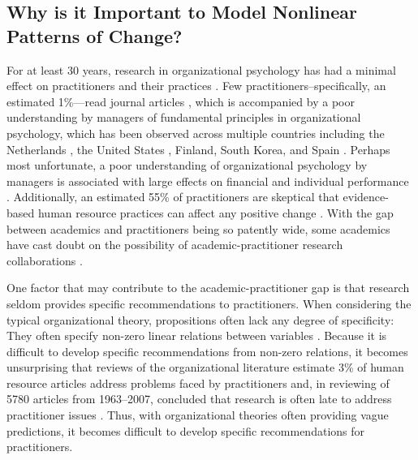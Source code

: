\documentclass[
12pt, %
twoside,
english]{guelphthesis}
\begin{document}
\hypertarget{why-is-it-important-to-model-nonlinear-patterns-of-change}{%
\subsection{Why is it Important to Model Nonlinear Patterns of Change?}\label{why-is-it-important-to-model-nonlinear-patterns-of-change}}

For at least 30 years, research in organizational psychology has had a minimal effect on practitioners and their practices \autocites{daft1990}[for a review, see][]{lawler2022}. Few practitioners--specifically, an estimated 1\%---read journal articles \autocite{rynes2002a}, which is accompanied by a poor understanding by managers of fundamental principles in organizational psychology, which has been observed across multiple countries including the Netherlands \autocite{sanders2008}, the United States \autocite{rynes2002a}, Finland, South Korea, and Spain \autocite{tenhiälä2014}. Perhaps most unfortunate, a poor understanding of organizational psychology by managers is associated with large effects on financial and individual performance \autocite[for a review, see][]{rynes2002b}. Additionally, an estimated 55\% of practitioners are skeptical that evidence-based human resource practices can affect any positive change \autocite{kpmg2015}. With the gap between academics and practitioners being so patently wide, some academics have cast doubt on the possibility of academic-practitioner research collaborations \autocite{kieser2009}.

One factor that may contribute to the academic-practitioner gap is that research seldom provides specific recommendations to practitioners. When considering the typical organizational theory, propositions often lack any degree of specificity: They often specify non-zero linear relations between variables \autocite{edwards2010}. Because it is difficult to develop specific recommendations from non-zero relations, it becomes unsurprising that reviews of the organizational literature estimate 3\% of human resource articles address problems faced by practitioners \autocite{sackett1990} and, in reviewing of 5780 articles from 1963--2007, concluded that research is often late to address practitioner issues \autocite{cascio2008}. Thus, with organizational theories often providing vague predictions, it becomes difficult to develop specific recommendations for practitioners.
\end{document}
